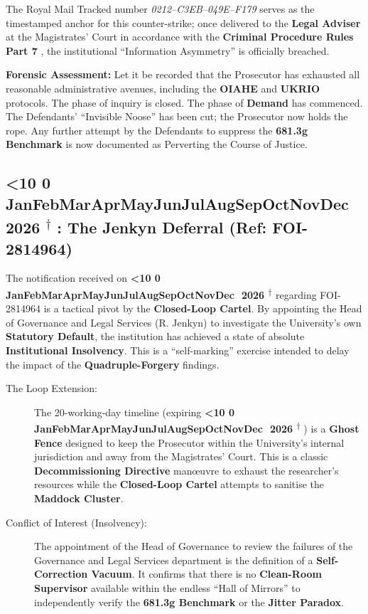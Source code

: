 \documentclass{EMBASSY}
\DeclareRobustCommand{\gmt}[3]{%
    \texorpdfstring{%
        {\color{DateGold}\textbf{%
            \ifnum#1<10 0\fi#1\,\textperiodcentered\,%
            \ifcase#2\or Jan\or Feb\or Mar\or Apr\or May\or Jun\or Jul\or Aug\or Sep\or Oct\or Nov\or Dec\fi
            \,\textperiodcentered\,20#3%
            \textsuperscript{$\dagger$}%
        }}%
    }{%
        (#1/#2/#3)%
    }%
}
\begin{document}
The Royal Mail Tracked number \textit{0212--C3EB--049E--F179} serves as the timestamped anchor for this counter-strike; once delivered to the \textbf{Legal Adviser} at the Magistrates' Court in accordance with the \textbf{Criminal Procedure Rules Part 7} \cite{CrimPR}, the institutional ``Information Asymmetry'' is officially breached.

\textbf{Forensic Assessment:} Let it be recorded that the Prosecutor has exhausted all reasonable administrative avenues, including the \textbf{OIAHE} \cite{OIA-Rules18} and \textbf{UKRIO} \cite{UKRIO} protocols. The phase of inquiry is closed. The phase of \textbf{Demand} has commenced. The Defendants' ``Invisible Noose'' has been cut; the Prosecutor now holds the rope. Any further attempt by the Defendants to suppress the \textbf{681.3g Benchmark} \cite{SIG05} is now documented as Perverting the Course of Justice.

\subsection{\gmt{25}{3}{26}: The Jenkyn Deferral (Ref: FOI-2814964)}
The notification received on \textbf{\gmt{20}{3}{26}} regarding FOI-2814964 is a tactical pivot by the \textbf{Closed-Loop Cartel}. By appointing the Head of Governance and Legal Services (R. Jenkyn) to investigate the University's own \textbf{Statutory Default}, the institution has achieved a state of absolute \textbf{Institutional Insolvency}. This is a ``self-marking'' exercise intended to delay the impact of the \textbf{Quadruple-Forgery} findings.

\begin{description}
	\item[The Loop Extension:] The 20-working-day timeline (expiring \gmt{17}{4}{26}) is a \textbf{Ghost Fence} designed to keep the Prosecutor within the University's internal jurisdiction and away from the Magistrates' Court. This is a classic \textbf{Decommissioning Directive} man\oe uvre to exhaust the researcher's resources while the \textbf{Closed-Loop Cartel} attempts to sanitise the \textbf{Maddock Cluster}.
	\item[Conflict of Interest (Insolvency):] The appointment of the Head of Governance to review the failures of the Governance and Legal Services department is the definition of a \textbf{Self-Correction Vacuum}. It confirms that there is no \textbf{Clean-Room Supervisor} available within the endless ``Hall of Mirrors'' to independently verify the \textbf{681.3g Benchmark} or the \textbf{Jitter Paradox}.
\end{description}
\end{document}
